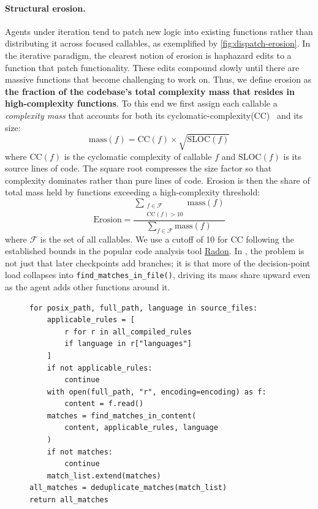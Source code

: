 \paragraph{Structural erosion.} Agents under iteration tend to patch new logic into existing functions rather than distributing it across focused callables, as exemplified by \autoref{fig:dispatch-erosion}. In the iterative paradigm, the clearest notion of erosion is haphazard edits to a function that patch functionality. These edits compound slowly until there are massive functions that become challenging to work on. Thus, we define erosion as \textbf{the fraction of the codebase's total complexity mass that resides in high-complexity functions}. To this end we first assign each callable a \emph{complexity mass} that accounts for both its cyclomatic-complexity(CC)~\citep{mccabe1976-complexity} and its size:
\begin{equation}
\label{eq:mass}
\text{mass}(f) = \text{CC}(f) \times \sqrt{\text{SLOC}(f)}
\end{equation}
where $\text{CC}(f)$ is the cyclomatic complexity of callable $f$ and $\text{SLOC}(f)$ is its source lines of code. The square root compresses the size factor so that complexity dominates rather than pure lines of code. Erosion is then the share of total mass held by functions exceeding a high-complexity threshold:
\begin{equation}
\label{eq:erosion}
\text{Erosion}
=  \frac{\sum_{\substack{f \in \mathcal{F} \\ \text{CC}(f) > 10}} \text{mass}(f)}{\sum_{f \in \mathcal{F}} \text{mass}(f)}
\end{equation}
where $\mathcal{F}$ is the set of all callables. We use a cutoff of 10 for CC following the established bounds in the popular code analysis tool \href{https://radon.readthedocs.io/en/latest/}{Radon}. In \codesearch{}, the problem is not just that later checkpoints add branches; it is that more of the decision-point load collapses into \texttt{find\_matches\_in\_file()}, driving its mass share upward even as the agent adds other functions around it.

\begin{figure}[t]
\begin{lstlisting}[caption={Overly verbose code from \codesearch{}. Identity list comprehension instead of \texttt{filter}, empty checks instead of building around iteration, and single-use variables.},label={fig:verbosity-example}]
for posix_path, full_path, language in source_files:
    applicable_rules = [
        r for r in all_compiled_rules
        if language in r["languages"]
    ]
    if not applicable_rules:
        continue
    with open(full_path, "r", encoding=encoding) as f:
        content = f.read()
    matches = find_matches_in_content(
        content, applicable_rules, language
    )
    if not matches:
        continue
    match_list.extend(matches)
all_matches = deduplicate_matches(match_list)
return all_matches
\end{lstlisting}
\end{figure}
